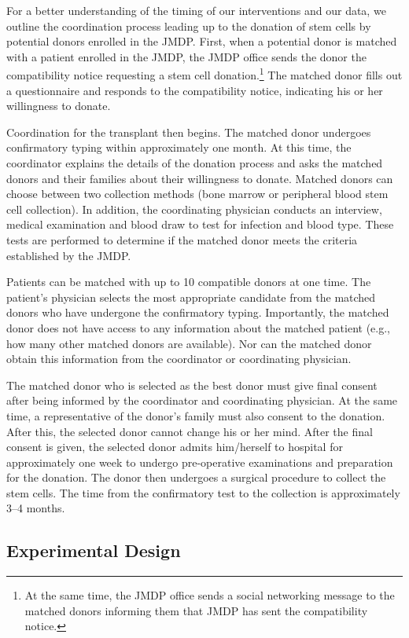 \documentclass[
]{article}
\begin{document}
For a better understanding of the timing of our interventions and our data, we outline the coordination process leading up to the donation of stem cells by potential donors enrolled in the JMDP. First, when a potential donor is matched with a patient enrolled in the JMDP, the JMDP office sends the donor the compatibility notice requesting a stem cell donation.\footnote{At the same time, the JMDP office sends a social networking message to the matched donors informing them that JMDP has sent the compatibility notice.} The matched donor fills out a questionnaire and responds to the compatibility notice, indicating his or her willingness to donate.

Coordination for the transplant then begins. The matched donor undergoes confirmatory typing within approximately one month. At this time, the coordinator explains the details of the donation process and asks the matched donors and their families about their willingness to donate. Matched donors can choose between two collection methods (bone marrow or peripheral blood stem cell collection). In addition, the coordinating physician conducts an interview, medical examination and blood draw to test for infection and blood type. These tests are performed to determine if the matched donor meets the criteria established by the JMDP.

Patients can be matched with up to 10 compatible donors at one time. The patient's physician selects the most appropriate candidate from the matched donors who have undergone the confirmatory typing. Importantly, the matched donor does not have access to any information about the matched patient (e.g., how many other matched donors are available). Nor can the matched donor obtain this information from the coordinator or coordinating physician.

The matched donor who is selected as the best donor must give final consent after being informed by the coordinator and coordinating physician. At the same time, a representative of the donor's family must also consent to the donation. After this, the selected donor cannot change his or her mind. After the final consent is given, the selected donor admits him/herself to hospital for approximately one week to undergo pre-operative examinations and preparation for the donation. The donor then undergoes a surgical procedure to collect the stem cells. The time from the confirmatory test to the collection is approximately 3--4 months.

\hypertarget{design}{%
\subsection{Experimental Design}\label{design}}
\end{document}

